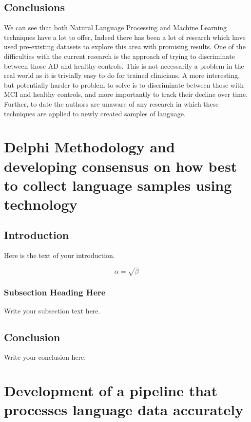 \documentclass[10pt, letterpaper, twoside, openany]{thesis}
\begin{document}
\section{Conclusions}\label{conclusions}
We can see that both Natural Language Processing and Machine Learning techniques have a lot to offer, Indeed there has been a lot of research which have used pre-existing datasets to explore this area with promising results. One of the difficulties with the current research is the approach of trying to discriminate between those AD and healthy controls. This is not necessarily a problem in the real world as it is trivially easy to do for trained clinicians. A more interesting, but potentially harder to problem to solve is to discriminate between those with MCI and healthy controls, and more importantly to track their decline over time. Further, to date the authors are unaware of any research in which these techniques are applied to newly created samples of language. 

\chapter{Delphi Methodology and developing consensus on how best to collect language samples using technology}
\section{Introduction}
Here is the text of your introduction.

\begin{equation}
    \label{simple_equation}
    \alpha = \sqrt{ \beta }
\end{equation}

\subsection{Subsection Heading Here}
Write your subsection text here.


\section{Conclusion}
Write your conclusion here.


\chapter{Development of a pipeline that processes language data accurately}
\end{document}
